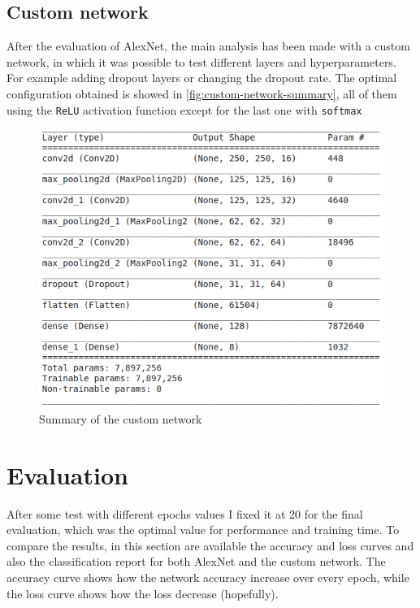 \documentclass[11pt]{article}
\begin{document}
	\subsection{Custom network}
	After the evaluation of AlexNet, the main analysis has been made with a custom
	network, in which it was possible to test different layers and hyperparameters.
	For example adding dropout layers or changing the dropout rate.
	The optimal configuration obtained is showed in \autoref{fig:custom-network-summary},
	all of them using the \texttt{ReLU} activation function except for the last one with \texttt{softmax}

	\begin{figure}[H]
		\centering
		\includegraphics[width=\textwidth]{assets/custom_network.png}
		\caption{Summary of the custom network}
		\label{fig:custom-network-summary}
	\end{figure}



	\section{Evaluation}
	After some test with different epochs values I fixed it at 20 for the final
	evaluation, which was the optimal value for performance and training time.
	To compare the results, in this section are available the accuracy and loss
	curves and also the classification report for both AlexNet and the custom network.
	The accuracy curve shows how the network accuracy increase over every epoch,
	while the loss curve shows how the loss decrease (hopefully).
\end{document}
